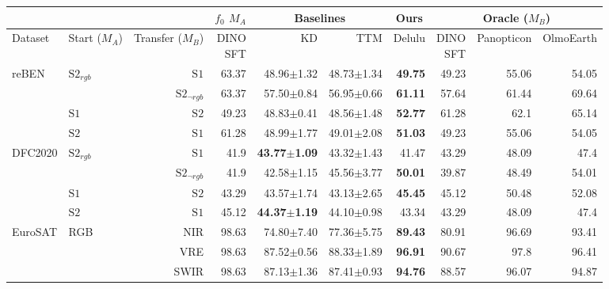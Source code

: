 \begin{tabular}{llr | r | rrr | rrr}
\toprule
\multicolumn{3}{c}{} & \multicolumn{1}{c|}{$f_0$ $M_A$} & \multicolumn{2}{c|}{Baselines} & \multicolumn{1}{c|}{Ours} & \multicolumn{3}{c}{Oracle ($M_B$)} \\
\midrule
Dataset & \shortstack[c]{Start\\($M_A$)} & \shortstack[c]{Transfer\\($M_B$)} & \shortstack[c]{DINO\\SFT} & KD & TTM & Delulu & \shortstack[c]{DINO\\SFT} & Panopticon & OlmoEarth \\
\midrule
  \multirow{4}{*}{reBEN} & \multirow{2}{*}{$\mathrm{S2}_{rgb}$} & $\mathrm{S1}$ & 63.37 & 48.96$\pm$1.32 & 48.73$\pm$1.34 & \textbf{49.75} & 49.23 & 55.06 & 54.05 \\
   &  & $\mathrm{S2}_{\neg rgb}$ & 63.37 & 57.50$\pm$0.84 & 56.95$\pm$0.66 & \textbf{61.11} & 57.64 & 61.44 & 69.64 \\
   & $\mathrm{S1}$ & $\mathrm{S2}$ & 49.23 & 48.83$\pm$0.41 & 48.56$\pm$1.48 & \textbf{52.77} & 61.28 & 62.1 & 65.14 \\
   & $\mathrm{S2}$ & $\mathrm{S1}$ & 61.28 & 48.99$\pm$1.77 & 49.01$\pm$2.08 & \textbf{51.03} & 49.23 & 55.06 & 54.05 \\
  \midrule
  \multirow{4}{*}{DFC2020} & \multirow{2}{*}{$\mathrm{S2}_{rgb}$} & $\mathrm{S1}$ & 41.9 & \textbf{43.77$\pm$1.09} & 43.32$\pm$1.43 & 41.47 & 43.29 & 48.09 & 47.4 \\
   &  & $\mathrm{S2}_{\neg rgb}$ & 41.9 & 42.58$\pm$1.15 & 45.56$\pm$3.77 & \textbf{50.01} & 39.87 & 48.49 & 54.01 \\
   & $\mathrm{S1}$ & $\mathrm{S2}$ & 43.29 & 43.57$\pm$1.74 & 43.13$\pm$2.65 & \textbf{45.45} & 45.12 & 50.48 & 52.08 \\
   & $\mathrm{S2}$ & $\mathrm{S1}$ & 45.12 & \textbf{44.37$\pm$1.19} & 44.10$\pm$0.98 & 43.34 & 43.29 & 48.09 & 47.4 \\
  \midrule
  \multirow{3}{*}{EuroSAT} & \multirow{3}{*}{RGB} & NIR & 98.63 & 74.80$\pm$7.40 & 77.36$\pm$5.75 & \textbf{89.43} & 80.91 & 96.69 & 93.41 \\
   &  & VRE & 98.63 & 87.52$\pm$0.56 & 88.33$\pm$1.89 & \textbf{96.91} & 90.67 & 97.8 & 96.41 \\
   &  & SWIR & 98.63 & 87.13$\pm$1.36 & 87.41$\pm$0.93 & \textbf{94.76} & 88.57 & 96.07 & 94.87 \\
\bottomrule
\end{tabular}
